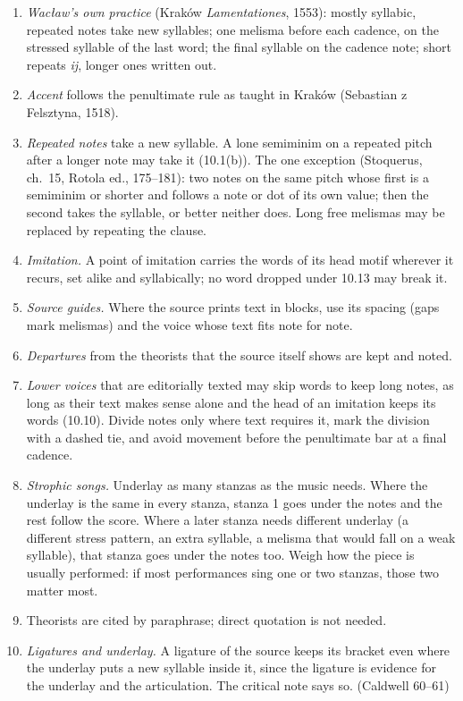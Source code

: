 \begin{enumerate}
\item
  \textit{Wacław's own practice} (Kraków \emph{Lamentationes}, 1553): mostly syllabic, repeated notes take new syllables; one melisma before each cadence, on the stressed syllable of the last word; the final syllable on the cadence note; short repeats \emph{ij}, longer ones written out.
\item
  \textit{Accent} follows the penultimate rule as taught in Kraków (Sebastian z Felsztyna, 1518).
\item
  \textit{Repeated notes} take a new syllable. A lone semiminim on a repeated pitch after a longer note may take it (10.1(b)). The one exception (Stoquerus, ch.~15, Rotola ed., 175--181): two notes on the same pitch whose first is a semiminim or shorter and follows a note or dot of its own value; then the second takes the syllable, or better neither does. Long free melismas may be replaced by repeating the clause.
\item
  \textit{Imitation.} A point of imitation carries the words of its head motif wherever it recurs, set alike and syllabically; no word dropped under 10.13 may break it.
\item
  \textit{Source guides.} Where the source prints text in blocks, use its spacing (gaps mark melismas) and the voice whose text fits note for note.
\item
  \textit{Departures} from the theorists that the source itself shows are kept and noted.
\item
  \textit{Lower voices} that are editorially texted may skip words to keep long notes, as long as their text makes sense alone and the head of an imitation keeps its words (10.10). Divide notes only where text requires it, mark the division with a dashed tie, and avoid movement before the penultimate bar at a final cadence.
\item
  \textit{Strophic songs.} Underlay as many stanzas as the music needs. Where the underlay is the same in every stanza, stanza 1 goes under the notes and the rest follow the score. Where a later stanza needs different underlay (a different stress pattern, an extra syllable, a melisma that would fall on a weak syllable), that stanza goes under the notes too. Weigh how the piece is usually performed: if most performances sing one or two stanzas, those two matter most.
\item
  Theorists are cited by paraphrase; direct quotation is not needed.
\item
  \textit{Ligatures and underlay.} A ligature of the source keeps its bracket even where the underlay puts a new syllable inside it, since the ligature is evidence for the underlay and the articulation. The critical note says so. (Caldwell 60--61)
\end{enumerate}


